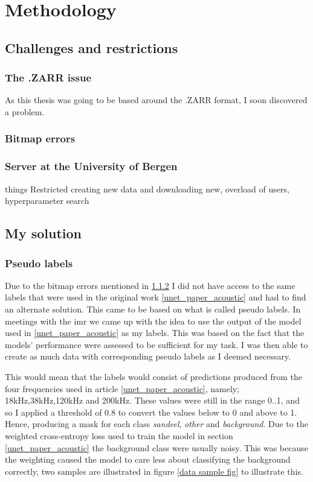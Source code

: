 \chapter{Methodology}
\section{Challenges and restrictions}
    \subsection{The .ZARR issue}
        As this thesis was going to be based around the .ZARR format, I soon discovered a problem. 
    \subsection{Bitmap errors} \label{bitmap_error}
        
        
    \subsection{Server at the University of Bergen}
        things
        Restricted creating new data and downloading new, overload of users, hyperparameter search
        
    

\section{My solution}
    \subsection{Pseudo labels} \label{Pseudo label}
        Due to the bitmap errors mentioned in \ref{bitmap_error} I did not have access to the same labels that were used in the original work \ref{unet_paper_acoustic} and had to find an alternate solution. This came to be based on what is called pseudo labels. In meetings with the \gls{imr} we came up with the idea to use the output of the model used in \ref{unet_paper_acoustic} as my labels. This was based on the fact that the models' performance were assessed to be sufficient for my task. I was then able to create as much data with corresponding pseudo labels as I deemed necessary.
        
        This would mean that the labels would consist of predictions produced from the four frequencies used in article \ref{unet_paper_acoustic}, namely; 18kHz,38kHz,120kHz and 200kHz. These values were still in the range 0..1, and so I applied a threshold of 0.8 to convert the values below to 0 and above to 1. Hence, producing a mask for each class \textit{sandeel}, \textit{other} and \textit{background}. Due to the weighted cross-entropy loss used to train the model in section \ref{unet_paper_acoustic} the background class were usually noisy. This was because the weighting caused the model to care less about classifying the background correctly, two samples are illustrated in figure \ref{data sample fig} to illustrate this.
        
